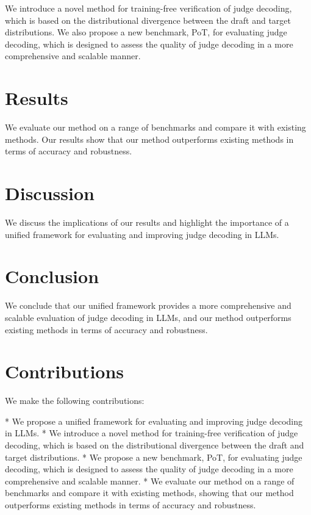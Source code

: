\begin{titlepage}
\vspace{1cm}
We introduce a novel method for training-free verification of judge decoding, which is based on the distributional divergence between the draft and target distributions. We also propose a new benchmark, PoT, for evaluating judge decoding, which is designed to assess the quality of judge decoding in a more comprehensive and scalable manner.

\section*{Results}

\vspace{1cm}
We evaluate our method on a range of benchmarks and compare it with existing methods. Our results show that our method outperforms existing methods in terms of accuracy and robustness.

\section*{Discussion}

\vspace{1cm}
We discuss the implications of our results and highlight the importance of a unified framework for evaluating and improving judge decoding in LLMs.

\section*{Conclusion}

\vspace{1cm}
We conclude that our unified framework provides a more comprehensive and scalable evaluation of judge decoding in LLMs, and our method outperforms existing methods in terms of accuracy and robustness.

\section*{Contributions}

\vspace{1cm}
We make the following contributions:

*   We propose a unified framework for evaluating and improving judge decoding in LLMs.
*   We introduce a novel method for training-free verification of judge decoding, which is based on the distributional divergence between the draft and target distributions.
*   We propose a new benchmark, PoT, for evaluating judge decoding, which is designed to assess the quality of judge decoding in a more comprehensive and scalable manner.
*   We evaluate our method on a range of benchmarks and compare it with existing methods, showing that our method outperforms existing methods in terms of accuracy and robustness.


\end{titlepage}
